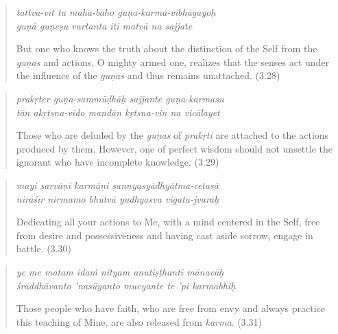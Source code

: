 \documentclass[12pt, twoside, openright]{memoir}
\begin{document}
\par
\begin{verse}
\textit{tattva-vit tu mahā-bāho guṇa-karma-vibhāgayoḥ} \\
\textit{guṇā guṇeṣu vartanta iti matvā na sajjate}

\noindent But one who knows the truth about the distinction of the Self from the \textit{guṇas} and actions, O mighty armed one, realizes that the senses act under the influence of the \textit{guṇas} and thus remains unattached. (3.28)
\end{verse}
\par



\par
\begin{verse}
\textit{prakṛter guṇa-sammūḍhāḥ sajjante guṇa-karmasu} \\
\textit{tān akṛtsna-vido mandān kṛtsna-vin na vicālayet}

\noindent Those who are deluded by the \textit{guṇas} of \textit{prakṛti} are attached to the actions produced by them. However, one of perfect wisdom should not unsettle the ignorant who have incomplete knowledge. (3.29)
\end{verse}
\par



\par
\begin{verse}
\textit{mayi sarvāṇi karmāṇi sannyasyādhyātma-cetasā} \\
\textit{nirāśīr nirmamo bhūtvā yudhyasva vigata-jvaraḥ}

\noindent Dedicating all your actions to Me, with a mind centered in the Self, free from desire and possessiveness and having cast aside sorrow, engage in battle. (3.30)
\end{verse}
\par



\par
\begin{verse}
\textit{ye me matam idaṁ nityam anutiṣṭhanti mānavāḥ} \\
\textit{śraddhāvanto ’nasūyanto mucyante te ’pi karmabhiḥ}

\noindent Those people who have faith, who are free from envy and always practice this teaching of Mine, are also released from \textit{karma}. (3.31)
\end{verse}
\par
\end{document}
